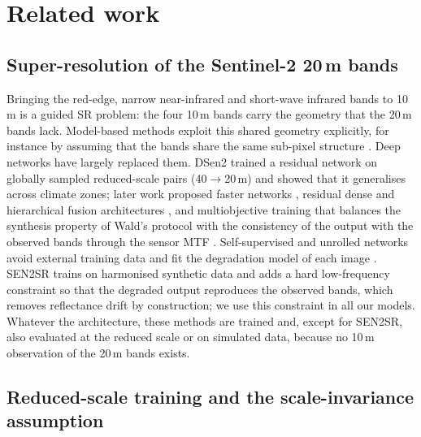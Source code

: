 \documentclass[pdflatex,sn-basic,referee,lineno]{sn-jnl}
\begin{document}
\section{Related work}\label{sec:related}

\subsection{Super-resolution of the Sentinel-2 20\,m bands}

Bringing the red-edge, narrow near-infrared and short-wave infrared bands to 10\,m is a guided SR problem: the
four 10\,m bands carry the geometry that the 20\,m bands lack. Model-based methods exploit this shared geometry
explicitly, for instance by assuming that the bands share the same sub-pixel structure \citep{brodu2017supres}.
Deep networks have largely replaced them. DSen2 \citep{lanaras2018dsen2} trained a residual network on globally
sampled reduced-scale pairs (40$\to$20\,m) and showed that it generalises across climate zones; later work proposed
faster networks \citep{gargiulo2019fast}, residual dense \citep{salgueiro2021rdsr} and hierarchical fusion
architectures \citep{wu2023hfn}, and multiobjective training that balances the synthesis property of Wald's protocol
with the consistency of the output with the observed bands through the sensor MTF \citep{vasilescu2023multiobjective}.
Self-supervised and unrolled networks avoid external training data and fit the degradation model of each image
\citep{qian2023selfs2,nguyen2023unrolling}. SEN2SR \citep{aybar2026sen2sr} trains on harmonised synthetic data and
adds a hard low-frequency constraint so that the degraded output reproduces the observed bands, which removes
reflectance drift by construction; we use this constraint in all our models. Whatever the architecture, these methods
are trained and, except for SEN2SR, also evaluated at the reduced scale or on simulated data, because no 10\,m
observation of the 20\,m bands exists.

\subsection{Reduced-scale training and the scale-invariance assumption}
\end{document}
